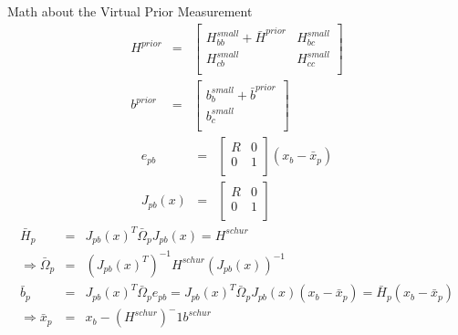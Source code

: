 \documentclass[10pt]{beamer}
\begin{document}
	\begin{frame}{Math about the Virtual Prior Measurement}
		\begin{equation}
		\begin{array}{rcl}
		H^{prior} & = & \left[\begin{array}{cc}
		H_{bb}^{small} + \bar{H}^{prior} & H_{bc}^{small} \\
		H_{cb}^{small} & H_{cc}^{small} \\
		\end{array}\right] \\
		b^{prior} & = & \left[\begin{array}{c}
		b_b^{small} + \bar{b}^{prior} \\
		b_c^{small} \\
		\end{array}\right]
		\end{array}
		\end{equation}
		\begin{equation}
		\begin{array}{rcl}
		e_{pb} & = & \left[\begin{array}{cc}
		R & 0 \\
		0 & 1 \\
		\end{array}\right] (x_b-\bar{x}_p) \\
		J_{pb}(x) & = & \left[\begin{array}{cc}
		R & 0 \\
		0 & 1 \\
		\end{array}\right]
		\end{array}
		\end{equation}
		\begin{equation}
		\begin{array}{rcl}
		\bar{H}_p & = & J_{pb}(x)^T \bar{\Omega}_p J_{pb}(x) = H^{schur}\\
		\Rightarrow \bar{\Omega}_p & = & (J_{pb}(x)^T)^{-1} H^{schur} (J_{pb}(x))^{-1} \\
		\bar{b}_p & = & J_{pb}(x)^T \bar{\Omega}_p e_{pb} = J_{pb}(x)^T \bar{\Omega}_p J_{pb}(x) (x_b-\bar{x}_p) = \bar{H}_p(x_b-\bar{x}_p) \\
		\Rightarrow \bar{x}_p & = & x_b-(H^{schur})^-1 b^{schur} \\
		\end{array}
		\end{equation}
	\end{frame}
\end{document}
